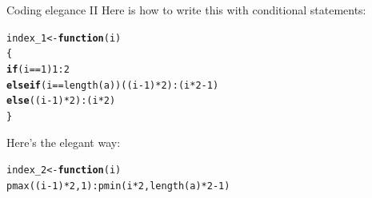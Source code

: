 \documentclass[xcolor=table,       handout,    xcolor=dvipsnames]{beamer}\usepackage[]{graphicx}\usepackage[]{color}
\makeatletter
\newcommand{\hlnum}[1]{\textcolor[rgb]{0,0,0}{#1}}
\newcommand{\hlopt}[1]{\textcolor[rgb]{0,0,0}{#1}}
\newcommand{\hlstd}[1]{\textcolor[rgb]{0,0,0}{#1}}
\newcommand{\hlkwa}[1]{\textcolor[rgb]{1,0,0}{\textbf{#1}}}
\newcommand{\hlkwb}[1]{\textcolor[rgb]{0,0,0}{#1}}
\newcommand{\hlkwc}[1]{\textcolor[rgb]{1,0,1}{#1}}
\newcommand{\hlkwd}[1]{\textcolor[rgb]{0,0,1}{#1}}
\newenvironment{kframe}{%
 \def\at@end@of@kframe{}%
 \ifinner\ifhmode%
  \def\at@end@of@kframe{\end{minipage}}%
  \begin{minipage}{\columnwidth}%
 \fi\fi%
 \def\FrameCommand##1{\hskip\@totalleftmargin \hskip-\fboxsep
 \colorbox{shadecolor}{##1}\hskip-\fboxsep
     \hskip-\linewidth \hskip-\@totalleftmargin \hskip\columnwidth}%
 \MakeFramed {\advance\hsize-\width
   \@totalleftmargin\z@ \linewidth\hsize
   \@setminipage}}%
 {\par\unskip\endMakeFramed%
 \at@end@of@kframe}
\newenvironment{knitrout}{}{} %
\makeatother
\begin{document}
\begin{frame}[fragile]{Coding elegance II}
Here is how to write this with conditional statements:
\begin{knitrout}
\color{fgcolor}\begin{kframe}
\begin{alltt}
\hlstd{index_1} \hlkwb{<-} \hlkwa{function}\hlstd{(}\hlkwc{i}\hlstd{)}
\hlstd{\{}
\hlkwa{if}\hlstd{(i} \hlopt{==} \hlnum{1}\hlstd{)}                       \hlnum{1} \hlopt{:} \hlnum{2}
\hlkwa{else if}\hlstd{(i} \hlopt{==} \hlkwd{length}\hlstd{(a))  ((i}\hlopt{-}\hlnum{1}\hlstd{)}\hlopt{*}\hlnum{2}\hlstd{)} \hlopt{:} \hlstd{(i}\hlopt{*}\hlnum{2}\hlopt{-}\hlnum{1}\hlstd{)}
\hlkwa{else}                     \hlstd{((i}\hlopt{-}\hlnum{1}\hlstd{)}\hlopt{*}\hlnum{2}\hlstd{)} \hlopt{:} \hlstd{(i}\hlopt{*}\hlnum{2}\hlstd{)}
\hlstd{\}}
\end{alltt}
\end{kframe}
\end{knitrout}
Here's the elegant way:
\begin{knitrout}
\color{fgcolor}\begin{kframe}
\begin{alltt}
\hlstd{index_2} \hlkwb{<-} \hlkwa{function}\hlstd{(}\hlkwc{i}\hlstd{)}
  \hlkwd{pmax}\hlstd{((i}\hlopt{-}\hlnum{1}\hlstd{)}\hlopt{*}\hlnum{2}\hlstd{,} \hlnum{1}\hlstd{)} \hlopt{:} \hlkwd{pmin}\hlstd{(i}\hlopt{*}\hlnum{2}\hlstd{,} \hlkwd{length}\hlstd{(a)}\hlopt{*}\hlnum{2}\hlopt{-}\hlnum{1}\hlstd{)}
\end{alltt}
\end{kframe}
\end{knitrout}
\end{frame}

\end{document}

